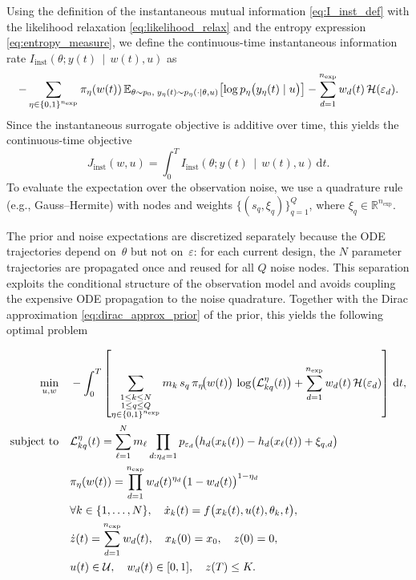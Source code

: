 \documentclass[a4paper,11pt]{article}
\begin{document}
Using the definition of the instantaneous mutual information \eqref{eq:I_inst_def} with the likelihood relaxation \eqref{eq:likelihood_relax} and the entropy expression \eqref{eq:entropy_measure}, we define the continuous-time instantaneous information rate $I_{\mathrm{inst}}\!\left(\theta; y(t) \,\middle|\, w(t), u\right)$ as
\[
-
\sum_{\eta\in\{0,1\}^{n_{\mathrm{exp}}}}
\pi_\eta(w(t))
\,
\mathbb{E}_{\theta\sim p_0,\;y_\eta(t)\sim p_\eta(\cdot\mid\theta,u)}
\!\left[
\log p_\eta\big(y_\eta(t)\mid u\big)
\right]
-
\sum_{d=1}^{n_{\mathrm{exp}}} w_d(t)\, {\cal H}(\varepsilon_d).
\]
Since the instantaneous surrogate objective is additive over time, this yields the continuous-time objective
\begin{equation}
J_{\mathrm{inst}}(w,u)
=
\int_0^T
I_{\mathrm{inst}}\!\left(\theta; y(t)\,\middle|\, w(t),u\right)\,\mathrm{d}t.
\end{equation}
To evaluate the expectation over the observation noise, we use a quadrature rule (e.g., Gauss--Hermite) with nodes and weights $\{(s_q,\xi_q)\}_{q=1}^Q$, where $\xi_q\in\mathbb{R}^{n_{\mathrm{exp}}}$. 

The prior and noise expectations are discretized separately because the ODE
trajectories depend on~\(\theta\) but not on~\(\varepsilon\): for each current
design, the \(N\) parameter trajectories are propagated once and reused for all
\(Q\) noise nodes. This separation exploits the conditional structure of the
observation model and avoids coupling the expensive ODE propagation to the
noise quadrature.
Together with the Dirac approximation \eqref{eq:dirac_approx_prior} of the prior, this yields the following optimal problem

\begin{equation}
\begin{aligned}
\min_{u, w} \quad & -
\int_0^T \left[
\sum_{\substack{1\le k\le N\\ 1\le q\le Q\\ \eta\in\{0,1\}^{n_{\mathrm{exp}}}}}
m_k\, s_q\,
\pi_\eta\!\big(w(t)\big)
\,
\log\!\big(\mathcal L_{kq}^{\eta}(t)\big)
+ \sum_{d=1}^{n_{\mathrm{exp}}} w_{d}(t)\, {\cal H}(\varepsilon_d)\right]\,\mathrm{d}t , \\
\text{subject to} \quad
& \mathcal L_{kq}^\eta(t)
=
\sum_{\ell=1}^N
m_\ell
\prod\limits_{d:\eta_d = 1}
p_{\varepsilon_d}\big(
h_d(x_k(t))-
h_d(x_\ell(t))+
\xi_{q,d}
\big)\\
& \pi_\eta(w(t))
=
\prod_{d=1}^{n_{\mathrm{exp}}}
w_d(t)^{\eta_d}
\bigl(1-w_d(t)\bigr)^{1-\eta_d} \\
&\forall k \in \{1,\dots,N\}, \quad \dot{x}_k(t) = f\bigl(x_k(t), u(t), \theta_k, t\bigr), \\
& \dot{z}(t) = \sum_{d=1}^{n_{\mathrm{exp}}}w_d(t), \quad x_k(0) = x_0, \quad z(0) = 0, \\
& u(t) \in \mathcal{U}, \quad w_d(t) \in [0,1], \quad z(T) \le K.
\end{aligned} \label{eq:optimisation_prbl_inst}
\end{equation}
\end{document}
